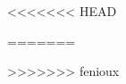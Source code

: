 
<<<<<<< HEAD
\newcommand{\inputarticle}[1]{%

\myclearpage
\renewcommand{\thesection}{\arabic{section}}
}


\inputarticle{MonNom}
=======


>>>>>>> fenioux


